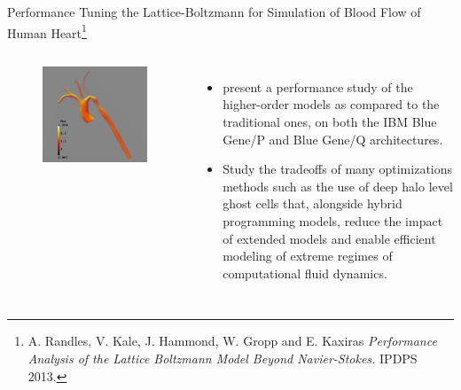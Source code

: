 \begin{frame}{Performance Tuning the Lattice-Boltzmann for Simulation of Blood Flow of Human Heart\footnote{\tiny {A. Randles, V. Kale, J. Hammond, W. Gropp and E. Kaxiras} {\it Performance Analysis of the Lattice Boltzmann Model Beyond Navier-Stokes.} IPDPS 2013.}}

\begin{columns} 
\begin{figure}[ht!]
\includegraphics[scale=0.1]{images/Fluid-density-in-the-aorta.png}
\end{figure}

\begin{itemize}
\footnotesize  \item \footnotesize present a performance study of the higher-order models as compared to the traditional ones, on both the IBM Blue Gene/P and Blue Gene/Q architectures. 
\item \footnotesize Study the tradeoffs of many optimizations methods such as the use of deep halo level ghost cells that, alongside hybrid programming models, reduce the impact of extended models and enable efficient modeling of extreme regimes of computational fluid dynamics. 
\end{itemize} 
\end{columns}


\end{frame}

